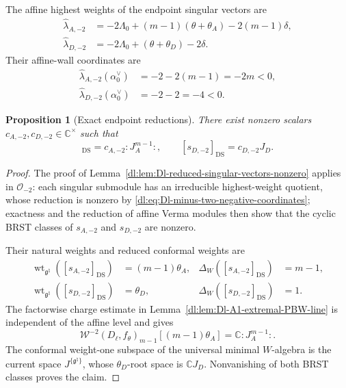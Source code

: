 \documentclass[11pt,reqno]{amsart}
\newtheorem{proposition}[theorem]{Proposition}
\theoremstyle{definition}
\theoremstyle{remark}
\begin{document}
The affine highest weights of the endpoint singular vectors are
\begin{equation*}
\begin{aligned}
  \widehat\lambda_{A,-2}
  &=-2\Lambda_0+(m-1)(\theta+\theta_A)-2(m-1)\delta,\\
  \widehat\lambda_{D,-2}
  &=-2\Lambda_0+(\theta+\theta_D)-2\delta.
\end{aligned}
\end{equation*}
Their affine-wall coordinates are
\begin{equation}
\begin{aligned}
  \widehat\lambda_{A,-2}(\alpha_0^\vee)
  &=-2-2(m-1)=-2m<0,\\
  \widehat\lambda_{D,-2}(\alpha_0^\vee)
  &=-2-2=-4<0.
\end{aligned}
\label{dl:eq:Dl-minus-two-negative-coordinates}
\end{equation}

\begin{proposition}[Exact endpoint reductions]
\label{dl:prop:Dl-minus-two-exact-singular-reductions}
There exist nonzero scalars
\(c_{A,-2},c_{D,-2}\in\mathbb C^\times\) such that
\begin{equation*}
  [s_{A,-2}]_{\mathrm{DS}}
  =
  c_{A,-2}:J_A^{m-1}:,
  \qquad
  [s_{D,-2}]_{\mathrm{DS}}
  =
  c_{D,-2}J_D.
\end{equation*}
\end{proposition}

\begin{proof}
The proof of Lemma~\ref{dl:lem:Dl-reduced-singular-vectors-nonzero}
applies in \(\mathcal O_{-2}\): each singular submodule has an
irreducible highest-weight quotient, whose reduction is nonzero by
\eqref{dl:eq:Dl-minus-two-negative-coordinates}; exactness and the
reduction of affine Verma modules then show that the cyclic BRST
classes of \(s_{A,-2}\) and \(s_{D,-2}\) are nonzero.

Their natural weights and reduced conformal weights are
\begin{equation*}
\begin{aligned}
  \operatorname{wt}_{\mathfrak g^\natural}
  ([s_{A,-2}]_{\mathrm{DS}})
  &=(m-1)\theta_A,
  &\Delta_W([s_{A,-2}]_{\mathrm{DS}})&=m-1,\\
  \operatorname{wt}_{\mathfrak g^\natural}
  ([s_{D,-2}]_{\mathrm{DS}})
  &=\theta_D,
  &\Delta_W([s_{D,-2}]_{\mathrm{DS}})&=1.
\end{aligned}
\end{equation*}
The factorwise charge estimate in
Lemma~\ref{dl:lem:Dl-A1-extremal-PBW-line} is independent of the affine
level and gives
\begin{equation*}
  \mathcal W^{-2}(D_\ell,f_\theta)_{m-1}
  [(m-1)\theta_A]
  =
  \mathbb C:J_A^{m-1}:.
\end{equation*}
The conformal weight-one subspace of the universal minimal
\(W\)-algebra is the current space
\(J^{\{\mathfrak g^\natural\}}\), whose \(\theta_D\)-root space is
\(\mathbb CJ_D\).  Nonvanishing of both BRST classes proves the
claim.
\end{proof}
\end{document}
